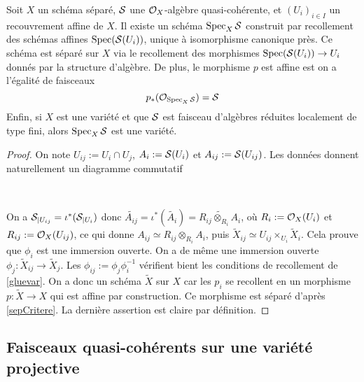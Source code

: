 \begin{cons}	\label{relspec}
Soit $X$ un schéma séparé, $\mathcal{S}$ une $\mathcal{O}_X$-algèbre quasi-cohérente, et $(U_i)_{i\in I}$ un recouvrement affine de $X$. Il existe un schéma $\operatorname{Spec}_X \mathcal{S}$ construit par recollement des schémas affines $\operatorname{Spec}(\mathcal{S}(U_i))$, unique à isomorphisme canonique près. Ce schéma est séparé sur $X$ via le recollement des morphismes $\operatorname{Spec}(\mathcal{S}(U_i))\rightarrow U_i$ donnés par la structure d'algèbre. De plus, le morphisme $p$ est affine est on a l'égalité de faisceaux
$$p_*(\mathcal{O}_{\operatorname{Spec}_X\mathcal{S}})=\mathcal{S}$$
Enfin, si $X$ est une variété et que $\mathcal{S}$ est faisceau d'algèbres réduites localement de type fini, alors $\operatorname{Spec}_X \mathcal{S}$ est une variété.
\end{cons}
\begin{proof}
On note $U_{ij}:=U_i\cap U_j$, $A_i:=\mathcal{S}(U_i)$ et $A_{ij}:=\mathcal{S}(U_{ij})$. Les données donnent naturellement un diagramme commutatif

	\begin{center}
	\\
	\end{center}
	
On a $\mathcal{S}_{|U_{ij}}=\iota^*(\mathcal{S}_{|U_i})$ donc $\widetilde{A_{ij}}=\iota^*(\widetilde{A_i})=\widetilde{R_{ij}\otimes_{R_i}A_i}$, où $R_i:=\mathcal{O}_X(U_i)$ et $R_{ij}:=\mathcal{O}_X(U_{ij})$, ce qui donne $A_{ij}\simeq R_{ij}\otimes_{R_i}A_i$, puis $\widetilde{X}_{ij}\simeq U_{ij}\times_{U_i}\widetilde{X}_i$. Cela prouve que $\phi_i$ est une immersion ouverte. On a de même une immersion ouverte $\phi_j:\widetilde{X}_{ij}\rightarrow \widetilde{X}_j$. Les $\phi_{ij}:=\phi_j\phi_i^{-1}$ vérifient bient les conditions de recollement de \ref{gluevar}. On a donc un schéma $\widetilde{X}$ sur $X$ car les $p_i$ se recollent en un morphisme $p:\widetilde{X}\rightarrow X$ qui est affine par construction. Ce morphisme est séparé d'après \ref{sepCritere}. La dernière assertion est claire par définition.
\end{proof}


\subsection{Faisceaux quasi-cohérents sur une variété projective}

